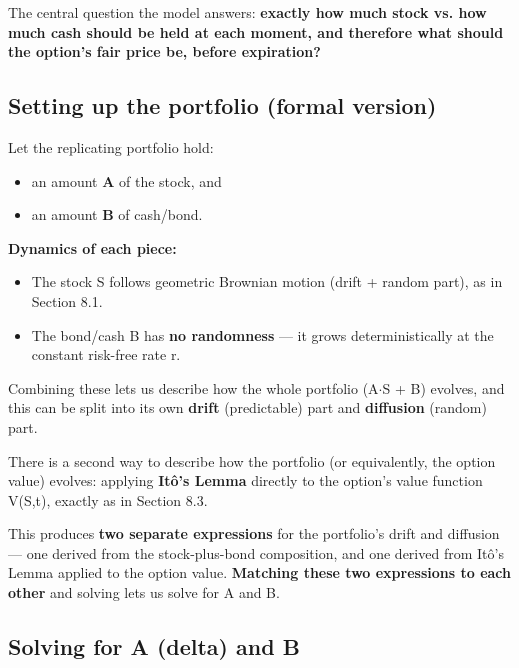 \documentclass[12pt,openany]{book}
\theoremstyle{definition}
\theoremstyle{remark}
\begin{document}
The central question the model answers: \textbf{exactly how much stock vs. how much cash should be held at each moment, and therefore what should the option's fair price be, before expiration?}

\subsection{Setting up the portfolio (formal version)}

Let the replicating portfolio hold:

\begin{itemize}
\item an amount \textbf{A} of the stock, and


\item an amount \textbf{B} of cash/bond.


\end{itemize}

\textbf{Dynamics of each piece:}

\begin{itemize}
\item The stock S follows geometric Brownian motion (drift + random part), as in Section 8.1.


\item The bond/cash B has \textbf{no randomness} --- it grows deterministically at the constant risk-free rate r.


\end{itemize}

Combining these lets us describe how the whole portfolio (A\(\cdot\)S + B) evolves, and this can be split into its own \textbf{drift} (predictable) part and \textbf{diffusion} (random) part.

There is a second way to describe how the portfolio (or equivalently, the option value) evolves: applying \textbf{Itô's Lemma} directly to the option's value function V(S,t), exactly as in Section 8.3.

This produces \textbf{two separate expressions} for the portfolio's drift and diffusion --- one derived from the stock-plus-bond composition, and one derived from Itô's Lemma applied to the option value. \textbf{Matching these two expressions to each other} and solving lets us solve for A and B.

\subsection{Solving for A (delta) and B}
\end{document}
